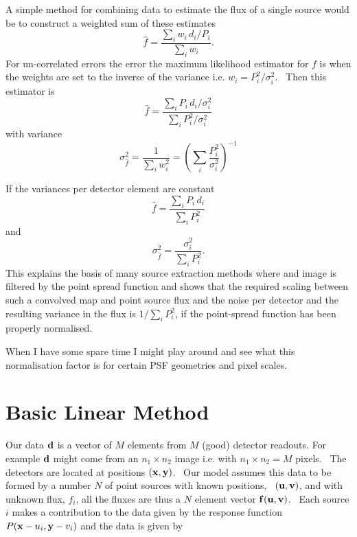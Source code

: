 \documentclass{article}
\begin{document}
A simple method for combining data to estimate the flux of a single source would be to construct a weighted sum of these estimates
\begin{equation}
\hat{f}=\frac{\sum_i w_i\, d_i/P_i}{\sum_i w_i}.
\end{equation}
For un-correlated errors the error the maximum likelihood estimator for $f$ is when the weights are set to the inverse of the variance i.e. $w_i=P_i^2/\sigma_i^2$.  Then this estimator is
\begin{equation}
\hat{f}=\frac{\sum_i P_i\, d_i/\sigma_i^2}{\sum_i P_i^2/\sigma_i^2}
\end{equation}
with variance
\begin{equation}
\sigma^2_{\hat{f}}=\frac{1}{\sum_i w_i^2}=\left(\sum_i{\frac{P_i^2}{\sigma_i^2}}\right)^{-1}
\end{equation}

If the variances per detector element are constant
\begin{equation}
\hat{f}=\frac{\sum_i P_i\, d_i}{\sum_i P_i^2}
\end{equation}
and 
\begin{equation}
\sigma^2_{\hat{f}}=\frac{{\sigma_i^2}}{\sum_i P_i^2}.
\end{equation}
This explains the basis of many source extraction methods where and image is filtered by the point spread function and shows that the required scaling between such a convolved map and point source flux and the noise per detector and the resulting variance in the flux is ${{1}}/{\sum_i P_i^2}$, if the point-spread function has been properly normalised.

When I have some spare time I might play around and see what this normalisation factor is for certain PSF geometries and pixel scales.


\section{Basic Linear Method}
Our data ${\bf d}$ is a vector of $M$ elements from $M$ (good) detector readouts. For example ${\bf d}$ might come from an $n_1\times n_2$ image i.e. with $n_1\times n_2=M$ pixels.  The detectors are located at positions $({\bf x,y})$.  Our model assumes this data to be formed by a number $N$ of point sources with known positions,  ${\bf (u,v)}$, and with unknown flux, $f_i$, all the fluxes are thus a $N$ element vector ${\bf f(u,v)}$.  Each source $i$ makes a contribution to the data given by the response function $P({\bf x}-u_i, {\bf y}-v_i)$ and the data is given by
\end{document}
